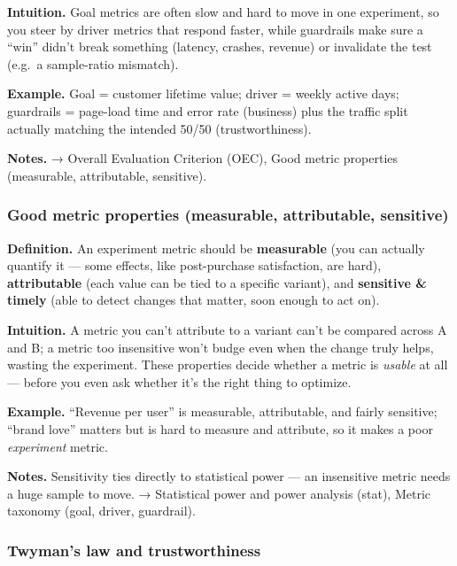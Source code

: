 \documentclass[
  10pt,
  letterpaper,
  onecolumn]{article}
\begin{document}
\textbf{Intuition.} Goal metrics are often slow and hard to move in one
experiment, so you steer by driver metrics that respond faster, while
guardrails make sure a ``win'' didn't break something (latency, crashes,
revenue) or invalidate the test (e.g.~a sample-ratio mismatch).

\textbf{Example.} Goal = customer lifetime value; driver = weekly active
days; guardrails = page-load time and error rate (business) plus the
traffic split actually matching the intended 50/50 (trustworthiness).

\textbf{Notes.} → Overall Evaluation Criterion (OEC), Good metric
properties (measurable, attributable, sensitive).

\hypertarget{good-metric-properties-measurable-attributable-sensitive}{%
\subsubsection{Good metric properties (measurable, attributable,
sensitive)}\label{good-metric-properties-measurable-attributable-sensitive}}

\textbf{Definition.} An experiment metric should be \textbf{measurable}
(you can actually quantify it --- some effects, like post-purchase
satisfaction, are hard), \textbf{attributable} (each value can be tied
to a specific variant), and \textbf{sensitive \& timely} (able to detect
changes that matter, soon enough to act on).

\textbf{Intuition.} A metric you can't attribute to a variant can't be
compared across A and B; a metric too insensitive won't budge even when
the change truly helps, wasting the experiment. These properties decide
whether a metric is \emph{usable} at all --- before you even ask whether
it's the right thing to optimize.

\textbf{Example.} ``Revenue per user'' is measurable, attributable, and
fairly sensitive; ``brand love'' matters but is hard to measure and
attribute, so it makes a poor \emph{experiment} metric.

\textbf{Notes.} Sensitivity ties directly to statistical power --- an
insensitive metric needs a huge sample to move. → Statistical power and
power analysis (stat), Metric taxonomy (goal, driver, guardrail).

\hypertarget{twymans-law-and-trustworthiness}{%
\subsubsection{Twyman's law and
trustworthiness}\label{twymans-law-and-trustworthiness}}
\end{document}

